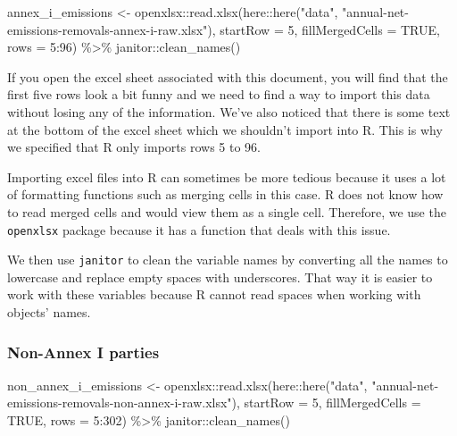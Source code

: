 \documentclass[
  12pt,
]{article}
\newenvironment{Shaded}{}{}
\newcommand{\AttributeTok}[1]{\textcolor[rgb]{0.49,0.56,0.16}{#1}}
\newcommand{\ConstantTok}[1]{\textcolor[rgb]{0.53,0.00,0.00}{#1}}
\newcommand{\DecValTok}[1]{\textcolor[rgb]{0.25,0.63,0.44}{#1}}
\newcommand{\FunctionTok}[1]{\textcolor[rgb]{0.02,0.16,0.49}{#1}}
\newcommand{\NormalTok}[1]{#1}
\newcommand{\OtherTok}[1]{\textcolor[rgb]{0.00,0.44,0.13}{#1}}
\newcommand{\SpecialCharTok}[1]{\textcolor[rgb]{0.25,0.44,0.63}{#1}}
\newcommand{\StringTok}[1]{\textcolor[rgb]{0.25,0.44,0.63}{#1}}
\begin{document}
\begin{Shaded}
\begin{Highlighting}[]
\NormalTok{annex\_i\_emissions }\OtherTok{\textless{}{-}}\NormalTok{ openxlsx}\SpecialCharTok{::}\FunctionTok{read.xlsx}\NormalTok{(here}\SpecialCharTok{::}\FunctionTok{here}\NormalTok{(}\StringTok{"data"}\NormalTok{, }
    \StringTok{"annual{-}net{-}emissions{-}removals{-}annex{-}i{-}raw.xlsx"}\NormalTok{), }
    \AttributeTok{startRow =} \DecValTok{5}\NormalTok{, }\AttributeTok{fillMergedCells =} \ConstantTok{TRUE}\NormalTok{, }
    \AttributeTok{rows =} \DecValTok{5}\SpecialCharTok{:}\DecValTok{96}\NormalTok{) }\SpecialCharTok{\%\textgreater{}\%}
\NormalTok{    janitor}\SpecialCharTok{::}\FunctionTok{clean\_names}\NormalTok{()}
\end{Highlighting}
\end{Shaded}

If you open the excel sheet associated with this document, you will find
that the first five rows look a bit funny and we need to find a way to
import this data without losing any of the information. We've also
noticed that there is some text at the bottom of the excel sheet which
we shouldn't import into R. This is why we specified that R only imports
rows 5 to 96.

Importing excel files into R can sometimes be more tedious because it
uses a lot of formatting functions such as merging cells in this case. R
does not know how to read merged cells and would view them as a single
cell. Therefore, we use the \texttt{openxlsx} package because it has a
function that deals with this issue.

We then use \texttt{janitor} to clean the variable names by converting
all the names to lowercase and replace empty spaces with underscores.
That way it is easier to work with these variables because R cannot read
spaces when working with objects' names.

\hypertarget{non-annex-i-parties}{%
\subsubsection{Non-Annex I parties}\label{non-annex-i-parties}}

\begin{Shaded}
\begin{Highlighting}[]
\NormalTok{non\_annex\_i\_emissions }\OtherTok{\textless{}{-}}\NormalTok{ openxlsx}\SpecialCharTok{::}\FunctionTok{read.xlsx}\NormalTok{(here}\SpecialCharTok{::}\FunctionTok{here}\NormalTok{(}\StringTok{"data"}\NormalTok{, }
    \StringTok{"annual{-}net{-}emissions{-}removals{-}non{-}annex{-}i{-}raw.xlsx"}\NormalTok{), }
    \AttributeTok{startRow =} \DecValTok{5}\NormalTok{, }\AttributeTok{fillMergedCells =} \ConstantTok{TRUE}\NormalTok{, }
    \AttributeTok{rows =} \DecValTok{5}\SpecialCharTok{:}\DecValTok{302}\NormalTok{) }\SpecialCharTok{\%\textgreater{}\%}
\NormalTok{    janitor}\SpecialCharTok{::}\FunctionTok{clean\_names}\NormalTok{()}
\end{Highlighting}
\end{Shaded}
\end{document}

